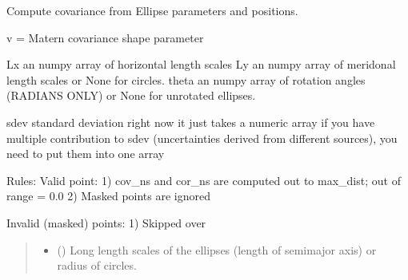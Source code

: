 \documentclass[letterpaper,10pt,english]{sphinxmanual}
\begin{document}
\begin{fulllineitems}
\label{\detokenize{ellipse:glomar_gridding.ellipse.EllipseCovarianceBuilder}}
\pysigstartsignatures
\pysiglinewithargsret
{}
{\sphinxparamcomma {}\sphinxparamcomma {}\sphinxparamcomma {}\sphinxparamcomma {}\sphinxparamcomma {}\sphinxparamcomma {}\sphinxparamcomma {}\sphinxparamcomma {}\sphinxparamcomma {}\sphinxparamcomma {}\sphinxparamcomma {}}
{}
\pysigstopsignatures
\sphinxAtStartPar
Compute covariance from Ellipse parameters and positions.

\sphinxAtStartPar
v = Matern covariance shape parameter

\sphinxAtStartPar
Lx \sphinxhyphen{} an numpy array of horizontal length scales
Ly \sphinxhyphen{} an numpy array of meridonal length scales or None for circles.
theta \sphinxhyphen{} an numpy array of rotation angles (RADIANS ONLY) or None for
unrotated ellipses.

\sphinxAtStartPar
sdev \sphinxhyphen{} standard deviation \textendash{} right now it just takes a numeric array
if you have multiple contribution to sdev (uncertainties derived from
different sources), you need to put them into one array

\sphinxAtStartPar
Rules:
Valid point:
1) cov\_ns and cor\_ns are computed out to max\_dist; out of range = 0.0
2) Masked points are ignored

\sphinxAtStartPar
Invalid (masked) points:
1) Skipped over
\begin{quote}\begin{description}
\begin{itemize}
\item {}
\sphinxAtStartPar
{} () \textendash{} Long length scales of the ellipses (length of semi\sphinxhyphen{}major axis) or radius
of circles.


\end{itemize}
\end{description}
\end{quote}
\end{fulllineitems}
\end{document}
